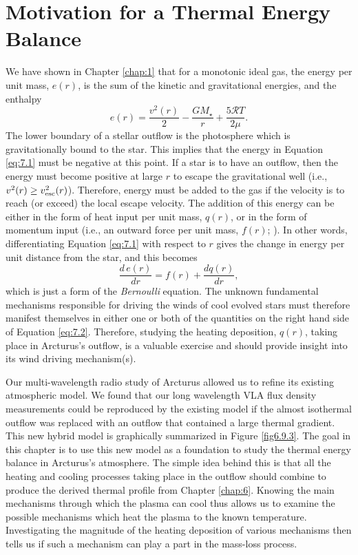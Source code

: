\section{Motivation for a Thermal Energy Balance}\label{sec:7.1}
We have shown in Chapter \ref{chap:1} that for a monotonic ideal gas, the energy per unit mass, $e(r)$, is the sum of the kinetic and gravitational energies, and the enthalpy
\begin{equation}
\label{eq:7.1}
e(r)=\frac{v^2(r)}{2}-\frac{GM_{\star}}{r}+\frac{5\mathcal{R}T}{2\mu}.
\end{equation}
The lower boundary of a stellar outflow is the photosphere which is gravitationally bound to the star. This implies that the energy in Equation \ref{eq:7.1} must be negative at this point. If a star is to have an outflow, then the energy must become positive at large $r$ to escape the gravitational well (i.e., $v^2(r) \geq v_{\rm{esc}}^2(r)$). Therefore, energy must be added to the gas if the velocity is to reach (or exceed) the local escape velocity. The addition of this energy can be either in the form of heat input per unit mass, $q(r)$, or in the form of momentum input (i.e., an outward force per unit mass, $f(r)$; \cite{lamers_1999}). In other words, differentiating Equation \ref{eq:7.1} with respect to $r$ gives the change in energy per unit distance from the star, and this becomes
\begin{equation}
\label{eq:7.2}
\frac{d\,e(r)}{dr}=f(r)+\frac{dq(r)}{dr},
\end{equation}
which is just a form of the \textit{Bernoulli} equation. The unknown fundamental mechanisms responsible for driving the winds of cool evolved stars must therefore manifest themselves in either one or both of the quantities on the right hand side of Equation \ref{eq:7.2}. Therefore, studying the heating deposition, $q(r)$, taking place in Arcturus's outflow, is a valuable exercise and should provide insight into its wind driving mechanism(s).

Our multi-wavelength radio study of Arcturus allowed us to refine its existing atmospheric model. We found that our long wavelength VLA flux density measurements could be reproduced by the existing model if the almost isothermal outflow was replaced with an outflow that contained a large thermal gradient. This new hybrid model is graphically summarized in Figure \ref{fig6.9.3}. The goal in this chapter is to use this new model as a foundation to study the thermal energy balance in Arcturus's atmosphere. The simple idea behind this is that all the heating and cooling processes taking place in the outflow should combine to produce the derived thermal profile from Chapter \ref{chap:6}. Knowing the main mechanisms through which the plasma can cool thus allows us to examine the possible mechanisms which heat the plasma to the known temperature. Investigating the magnitude of the heating deposition of various mechanisms then tells us if such a mechanism can play a part in the mass-loss process.

